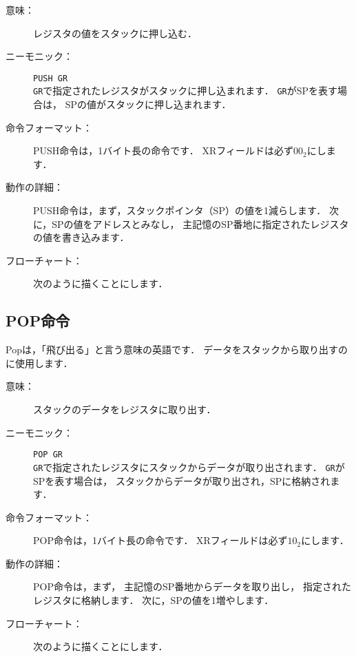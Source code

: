 \begin{description}
\item[意味：]レジスタの値をスタックに押し込む．

\item[ニーモニック：]{\tt PUSH  GR} \\
{\tt GR}で指定されたレジスタがスタックに押し込まれます．
{\tt GR}がSPを表す場合は，
SPの値がスタックに押し込まれます．

\item[命令フォーマット：]PUSH命令は，1バイト長の命令です．
XRフィールドは必ず$00_2$にします．


\item[動作の詳細：]PUSH命令は，まず，スタックポインタ（SP）の値を1減らします．
次に，SPの値をアドレスとみなし，
主記憶のSP番地に指定されたレジスタの値を書き込みます．

\item[フローチャート：]
次のように描くことにします．

\begin{center}
\end{center}

\end{description}

\subsection{POP命令}

Popは，「飛び出る」と言う意味の英語です．
データをスタックから取り出すのに使用します．

\begin{description}
\item[意味：]スタックのデータをレジスタに取り出す．

\item[ニーモニック：]{\tt POP  GR} \\
{\tt GR}で指定されたレジスタにスタックからデータが取り出されます．
{\tt GR}がSPを表す場合は，
スタックからデータが取り出され，SPに格納されます．

\item[命令フォーマット：]POP命令は，1バイト長の命令です．
XRフィールドは必ず$10_2$にします．


\item[動作の詳細：]POP命令は，まず，
主記憶のSP番地からデータを取り出し，
指定されたレジスタに格納します．
次に，SPの値を1増やします．

\item[フローチャート：]
次のように描くことにします．

\begin{center}
\end{center}
\end{description}

